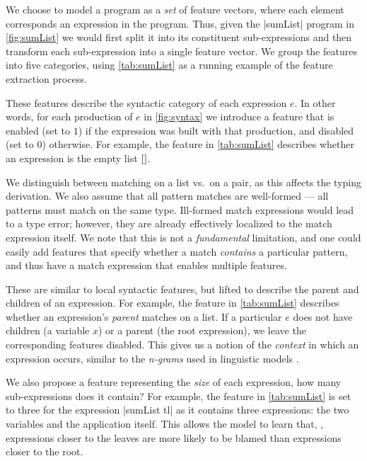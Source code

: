 We choose to model a program as a \emph{set} of feature vectors, where each element corresponds an expression in the
program.
%
Thus, given the |sumList| program in \autoref{fig:sumList} we would first split it into its constituent sub-expressions
and then transform each sub-expression into a single feature vector.
%
We group the features into five categories, using \autoref{tab:sumList} as a running example of the feature extraction
process.

These features describe the syntactic category of each expression $e$.
%
In other words, for each production of $e$ in \autoref{fig:syntax} we introduce a feature that is enabled (set to $1$)
if the expression was built with that production, and disabled (set to $0$) otherwise.
%
For example, the \IsNil feature in \autoref{tab:sumList} describes whether an expression is the empty list $\mathtt{[]}$.

We distinguish between matching on a list vs.\ on a pair, as this affects the typing derivation.
%
We also assume that all pattern matches are well-formed --- \ie all patterns must match on the same type.
%
Ill-formed match expressions would lead to a type error; however, they are already effectively localized to the match
expression itself.
%
We note that this is not a \emph{fundamental} limitation, and one could easily add features that specify whether a match
\emph{contains} a particular pattern, and thus have a match expression that enables multiple
features.

These are similar to local syntactic features, but lifted to describe the parent and children of an expression.
%
For example, the \IsCaseListP feature in \autoref{tab:sumList} describes whether an expression's \emph{parent} matches
on a list.
%
If a particular $e$ does not have children (\eg a variable $x$) or a parent (\ie the root expression), we leave the
corresponding features
disabled.
%
This gives us a notion of the \emph{context} in which an expression occurs, similar to the \emph{n-grams} used in
linguistic models \citep{Hindle2012-hf,Gabel2010-el}.

We also propose a feature representing the \emph{size} of each expression, \ie how many sub-expressions does it contain?
%
For example, the \ExprSize feature in \autoref{tab:sumList} is set to three for the expression |sumList tl| as it
contains three expressions: the two variables and the application itself.
%
This allows the model to learn that, \eg, expressions closer to the leaves are more likely to be blamed than expressions
closer to the root.


